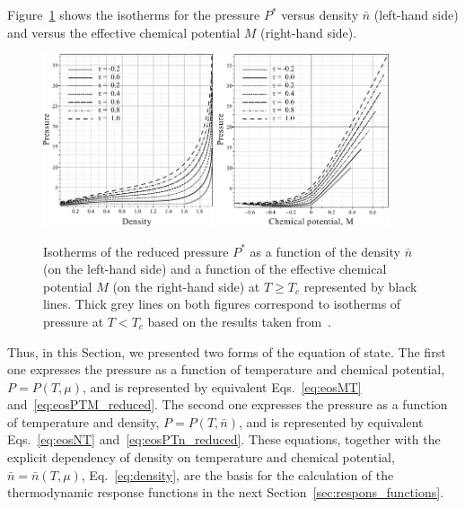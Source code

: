 Figure~\ref{fig1} shows the isotherms for the pressure $P^*$ versus density $\bar{n}$ (left-hand side) and versus the effective chemical potential $M$ (right-hand side).
\begin{figure}[h!]
	\centering 
	\includegraphics[width=0.446\textwidth]{f1a1.pdf} 
	\includegraphics[width=0.45\textwidth]{f1b1.pdf} 
	\vskip-3mm\caption{Isotherms of the reduced pressure $P^*$ as a function of the density $\bar n$ (on the left-hand side) and a function of the effective chemical potential $M$ (on the right-hand side) at $T \geq T_c$ represented by black lines. Thick grey lines on both figures correspond to isotherms of pressure at $T < T_c$ based on the results taken from~\cite{KozlovskiiDobush2020}. 
	}\label{fig1}
\end{figure}

Thus, in this Section, we presented two forms of the equation of state. The first one expresses the pressure as a function of temperature and chemical potential, $P = P(T, \mu)$, and is represented by equivalent Eqs.~\eqref{eq:eosMT} and~\eqref{eq:eosPTM_reduced}. The second one expresses the pressure as a function of temperature and density, $P = P(T, \bar{n})$, and is represented by equivalent Eqs.~\eqref{eq:eosNT} and~\eqref{eq:eosPTn_reduced}. These equations, together with the explicit dependency of density on temperature and chemical potential, $\bar{n} = \bar{n}(T, \mu)$, Eq.~\eqref{eq:density}, are the basis for the calculation of the thermodynamic response functions in the next Section~\ref{sec:respons_functions}. 

